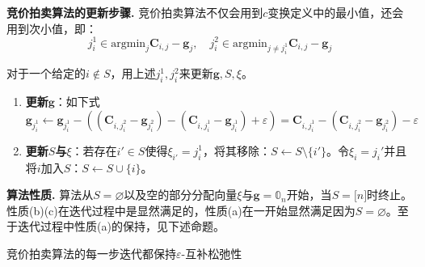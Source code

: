 \documentclass[cn,10pt,math=newtx,citestyle=gb7714-2015,bibstyle=gb7714-2015]{elegantbook}
\begin{document}
\textbf{竞价拍卖算法的更新步骤.} 竞价拍卖算法不仅会用到$c$变换定义中的最小值，还会用到次小值，即：
\begin{equation*}
    j_i^1\in \text{argmin}_j \mathbf{C}_{i,j}-\mathbf{g}_j,\quad j_i^2\in \text{argmin}_{j\neq j_i^1} \mathbf{C}_{i,j}-\mathbf{g}_j
\end{equation*}

对于一个给定的$i\notin S$，用上述$j_i^1,j_i^2$来更新$\mathbf{g},S,\xi$。

\begin{enumerate}
    \item \textbf{更新$\mathbf{g}$}：如下式
    \begin{equation}
        \label{3.9}
        \mathbf{g}_{j_i^1}\gets \mathbf{g}_{j_i^1}-\left((\mathbf{C}_{i,j_i^2}-\mathbf{g}_{j_i^2})-(\mathbf{C}_{i,j_i^1}-\mathbf{g}_{j_i^1})+\varepsilon\right)=\mathbf{C}_{i,j_i^1} - (\mathbf{C}_{i,j_i^2}-\mathbf{g}_{j_i^2}) - \varepsilon
    \end{equation}
    
    \item \textbf{更新$S$与$\xi$}：若存在$i'\in S$使得$\xi_{i'}=j_i^1$，将其移除：$S\gets S \setminus \{i'\}$。令$\xi_i=j_i'$并且将$i$加入$S$：$S\gets S\cup \{i\}$。
\end{enumerate}

\vspace{.6em}

\textbf{算法性质.} 算法从$S=\varnothing$以及空的部分分配向量$\xi$与$\mathbf{g}=\mathbb{0}_n$开始，当$S=\mathbb{[}n\mathbb{]}$时终止。性质(b)(c)在迭代过程中是显然满足的，性质(a)在一开始显然满足因为$S=\varnothing$。至于迭代过程中性质(a)的保持，见下述命题。

\begin{proposition}
竞价拍卖算法的每一步迭代都保持$\varepsilon$-互补松弛性
\end{proposition}
\end{document}
